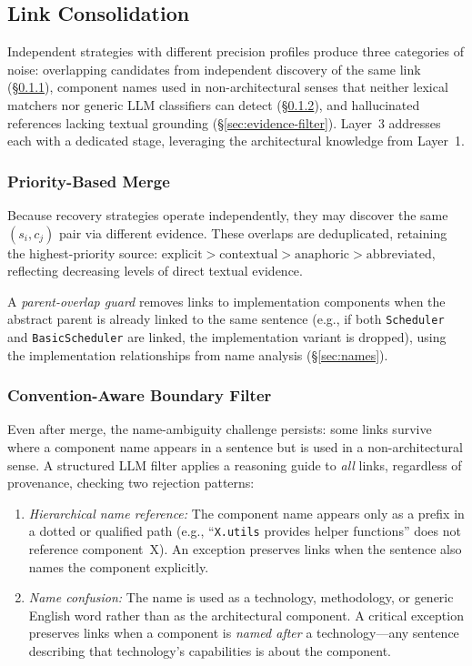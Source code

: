 
\subsection{Link Consolidation}\label{sec:merge}

Independent strategies with different precision profiles produce
three categories of noise:
overlapping candidates from independent discovery of the same
link (\S\ref{sec:dedup}),
component names used in non-architectural senses that neither
lexical matchers nor generic LLM classifiers can detect
(\S\ref{sec:boundary}), and
hallucinated references lacking textual grounding
(\S\ref{sec:evidence-filter}).
Layer~3 addresses each with a dedicated stage, leveraging the
architectural knowledge from Layer~1.

\subsubsection{Priority-Based Merge}\label{sec:dedup}

Because recovery strategies operate independently, they may
discover the same $(s_i, c_j)$ pair via different evidence.
These overlaps are deduplicated, retaining the highest-priority
source:
$\text{explicit} > \text{contextual} > \text{anaphoric} >
\text{abbreviated}$,
reflecting decreasing levels of direct textual evidence.

A \emph{parent-overlap guard} removes links to implementation
components when the abstract parent is already linked to the same
sentence (e.g., if both \texttt{Scheduler} and
\texttt{BasicScheduler} are linked, the implementation variant is
dropped), using the implementation relationships from name
analysis (\S\ref{sec:names}).

\subsubsection{Convention-Aware Boundary Filter}\label{sec:boundary}

Even after merge, the name-ambiguity challenge persists: some
links survive where a component name appears in a sentence but
is used in a non-architectural sense.
A structured LLM filter applies a reasoning guide to \emph{all}
links, regardless of provenance, checking two rejection patterns:
\begin{enumerate}
    \item \emph{Hierarchical name reference:}
      The component name appears only as a prefix in a dotted or
      qualified path (e.g., ``\texttt{X.utils} provides helper
      functions'' does not reference component~X).
      An exception preserves links when the sentence also names the
      component explicitly.
    \item \emph{Name confusion:}
      The name is used as a technology, methodology, or generic
      English word rather than as the architectural component.
      A critical exception preserves links when a component is
      \emph{named after} a technology---any sentence describing that
      technology's capabilities is about the component.
\end{enumerate}

